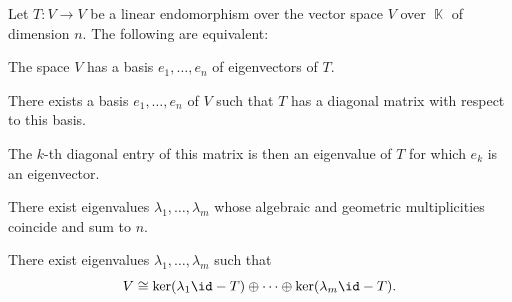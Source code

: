 \begin{proposition}\label{thm:operator_diagonalizability}
  Let \( T: V \to V \) be a linear endomorphism over the vector space \( V \) over \( \BbbK \) of dimension \( n \). The following are equivalent:
  \begin{thmenum}
     The space \( V \) has a basis \( e_1, \ldots, e_n \) of eigenvectors of \( T \).

     There exists a basis \( e_1, \ldots, e_n \) of \( V \) such that \( T \) has a diagonal matrix with respect to this basis.

    The \( k \)-th diagonal entry of this matrix is then an eigenvalue of \( T \) for which \( e_k \) is an eigenvector.

     There exist eigenvalues \( \lambda_1, \ldots, \lambda_m \) whose algebraic and geometric multiplicities coincide and sum to \( n \).

     There exist eigenvalues \( \lambda_1, \ldots, \lambda_m \) such that
    \begin{equation*}
      V \cong \ker(\lambda_1 \id - T) \oplus \cdots \oplus \ker(\lambda_m \id - T).
    \end{equation*}
  \end{thmenum}
\end{proposition}
